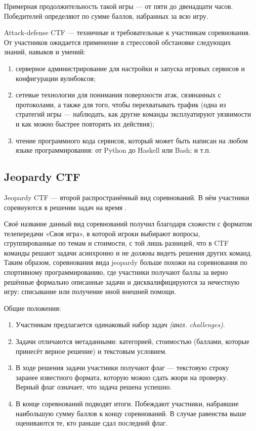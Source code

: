 Примерная продолжительность такой игры --- от пяти до двенадцати часов. Победителей определяют по сумме баллов, набранных за всю игру.

Attack-defense CTF — техничные и требовательные к участникам соревнования. От участников ожидается применение в стрессовой обстановке следующих знаний, навыков и умений:
\begin{enumerate}
  \item серверное администрирование для настройки и запуска игровых сервисов и конфигурации вулнбоксов;
  \item сетевые технологии для понимания поверхности атак, свзянанных с протоколами, а также для того, чтобы перехватывать трафик (одна из стратегий игры --- наблюдать, как другие команды эксплуатируют уязвимости и как можно быстрее повторять их действия\cite{ReplayAttacks});
  \item чтение программного кода сервисов, который может быть написан на любом языке программирования: от Python\cite{PythonService} до Haskell\cite{HaskellSerivce} или Bash\cite{BashService}; и т.п.
\end{enumerate}




\subsection{Jeopardy CTF}

Jeopardy CTF — второй распространённый вид соревнований. В нём участники соревнуются в решении задач на время \cite{Course}.

Своё название данный вид соревнований получил благодаря схожести с форматом телепередачи «Своя игра», в которой игроки выбирают вопросы, сгруппированные по темам и стоимости, с той лишь разницей, что в CTF команды решают задачи асинхронно и не должны видеть решения других команд. Таким образом, соревнования вида jeopardy больше похожи на соревнования по спортивному программированию, где участники получают баллы за верно решённые формально описанные задачи и дисквалифицируются за нечестную игру: списывание или получение иной внешней помощи.

Общие положения:

\begin{enumerate}
  \item Участникам предлагается одинаковый набор задач \textit{(англ. challenges)}.
  \item Задачи отличаются метаданными: категорией, стоимостью (баллами, которые принесёт верное решение) и текстовым условием.
  \item В ходе решения задачи участники получают флаг — текстовую строку заранее известного формата, которую можно сдать жюри на проверку. Верный флаг означает, что задача решена успешно.
  \item В конце соревнований подводят итоги. Побеждают участники, набравшие наибольшую сумму баллов к концу соревнований. В случае равенства выше оцениваются те, кто раньше сдал последний флаг.
\end{enumerate}

